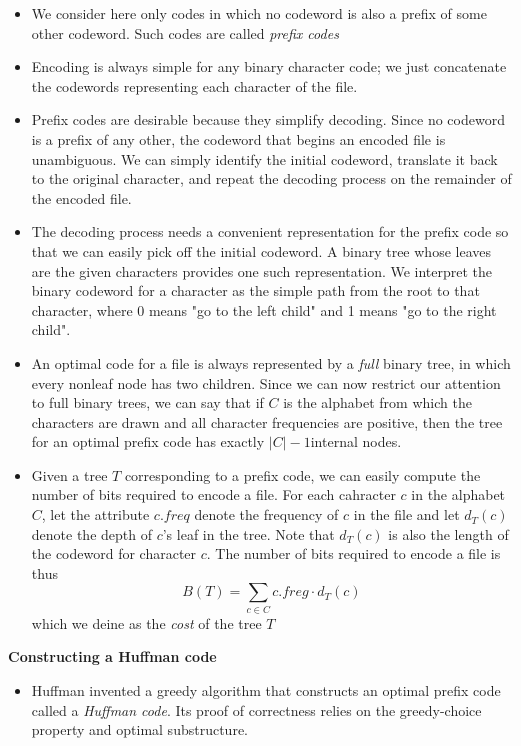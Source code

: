 \documentclass{report}
\begin{document}
\begin{itemize}
    \item We consider here only codes in which no codeword is also a prefix of some other codeword. Such codes are called \textit{prefix codes}
    \item Encoding is always simple for any binary character code; we just concatenate the codewords representing each character of the file.
    \item Prefix codes are desirable because they simplify decoding. Since no codeword is a prefix of any other, the codeword that begins an encoded file is unambiguous. We can simply identify the initial codeword, translate it back to the original character, and repeat the decoding process on the remainder of the encoded file.
    \item The decoding process needs a convenient representation for the prefix code so that we can easily pick off the initial codeword. A binary tree whose leaves are the given characters provides one such representation. We interpret the binary codeword for a character as the simple path from the root to that character, where 0 means "go to the left child" and 1 means "go to the right child".
    \item An optimal code for a file is always represented by a \textit{full} binary tree, in which every nonleaf node has two children. Since we can now restrict our attention to full binary trees, we can say that if $C$ is the alphabet from which the characters are drawn and all character frequencies are positive, then the tree for an optimal prefix code has exactly $|C| - 1$internal nodes.
    \item Given a tree $T$ corresponding to a prefix code, we can easily compute the number of bits required to encode a file. For each cahracter $c$ in the alphabet $C$, let the attribute $c.freq$ denote the frequency of $c$ in the file and let $d_T(c)$ denote the depth of $c$'s leaf in the tree. Note that $d_T(c)$ is also the length of the codeword for character $c$. The number of bits required to encode a file is thus
    $$B(T) = \sum_{c \in C} c.freg \cdot d_T(c)$$
    which we deine as the \textit{cost} of the tree $T$
\end{itemize}
\textbf{Constructing a Huffman code}
\begin{itemize}
    \item Huffman invented a greedy algorithm that constructs an optimal prefix code called a \textit{Huffman code}. Its proof of correctness relies on the greedy-choice property and optimal substructure.
\end{itemize}
\end{document}
